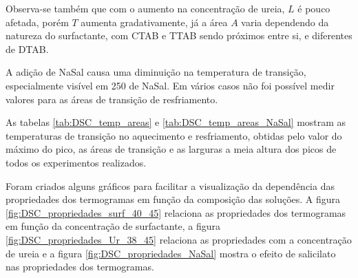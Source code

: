 		Observa-se também que com o aumento na concentração de ureia, $L$ é pouco afetada, porém $T$ aumenta gradativamente, já a área $A$ varia dependendo da natureza do surfactante, com CTAB e TTAB sendo próximos entre si, e diferentes de DTAB.
		
		A adição de NaSal causa uma diminuição na temperatura de transição, especialmente visível em 250\mM{} de NaSal. Em vários casos não foi possível medir valores para as áreas de transição de resfriamento.
		
		As tabelas \ref{tab:DSC_temp_areas} e \ref{tab:DSC_temp_areas_NaSal} mostram as temperaturas de transição no aquecimento e resfriamento, obtidas pelo valor do máximo do pico, as áreas de transição e as larguras a meia altura dos picos de todos os experimentos realizados.
		
		Foram criados alguns gráficos para facilitar a visualização da dependência das propriedades dos termogramas em função da composição das soluções. A figura \ref{fig:DSC_propriedades_surf_40_45} relaciona as propriedades dos termogramas em função da concentração de surfactante, a figura \ref{fig:DSC_propriedades_Ur_38_45} relaciona as propriedades com a concentração de ureia e a figura \ref{fig:DSC_propriedades_NaSal} mostra o efeito de salicilato nas propriedades dos termogramas.

